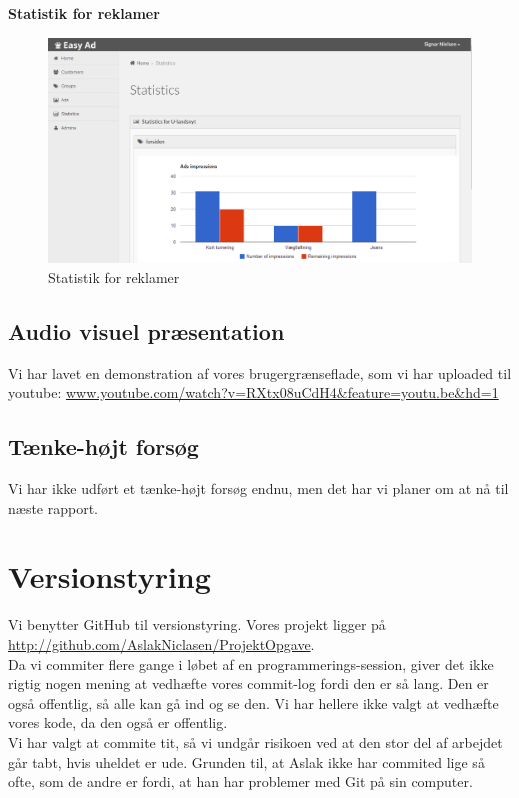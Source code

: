 \documentclass[a4paper,12pt]{article}
\begin{document}
\textbf{Statistik for reklamer}
\begin{figure}[h!]
  \centering
    \includegraphics[width=\textwidth]{statistics.png}
  \caption{Statistik for reklamer}
\end{figure}

\newpage
\subsection*{Audio visuel præsentation}
Vi har lavet en demonstration af vores brugergrænseflade, som vi har uploaded til youtube:
\newline
\url{www.youtube.com/watch?v=RXtx08uCdH4&feature=youtu.be&hd=1}

\subsection*{Tænke-højt forsøg}
Vi har ikke udført et tænke-højt forsøg endnu, men det har vi planer om at nå til næste rapport.

\section{Versionstyring}
Vi benytter GitHub til versionstyring. Vores projekt ligger på
\newline
\url{http://github.com/AslakNiclasen/ProjektOpgave}.
\newline
\\
Da vi commiter flere gange i løbet af en programmerings-session, giver det ikke rigtig nogen mening at vedhæfte vores commit-log fordi den er så lang. Den er også offentlig, så alle kan gå ind og se den. Vi har hellere ikke valgt at vedhæfte vores kode, da den også er offentlig.
\newline
\\
Vi har valgt at commite tit, så vi undgår risikoen ved at den stor del af arbejdet går tabt, hvis uheldet er ude. Grunden til, at Aslak ikke har commited lige så ofte, som de andre er fordi, at han har problemer med Git på sin computer.
\end{document}
